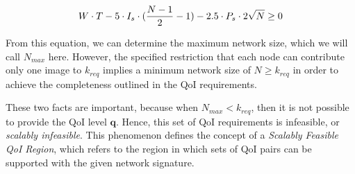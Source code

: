\begin{equation}
\setcounter{equation}{11}
	W \cdot T - 5 \cdot I_s \cdot (\frac{N-1}{2}-1) - 2.5 \cdot P_s \cdot 2 \sqrt{N} \geq 0
\end{equation}

From this equation, we can determine the maximum network size, which we will call $N_{max}$ here.  However, the specified restriction that each node can contribute only one image to $k_{req}$ implies a minimum network size of $N \geq k_{req}$ in order to achieve the completeness outlined in the QoI requirements. 

These two facts are important, because when $N_{max} < k_{req}$, then it is not possible to provide the QoI level $\mathbf{q}$.  Hence, this set of QoI requirements is infeasible, or \emph{scalably infeasible}.  This phenomenon defines the concept of a \emph{Scalably Feasible QoI Region}, which refers to the region in which sets of QoI pairs can be supported with the given network signature.  

